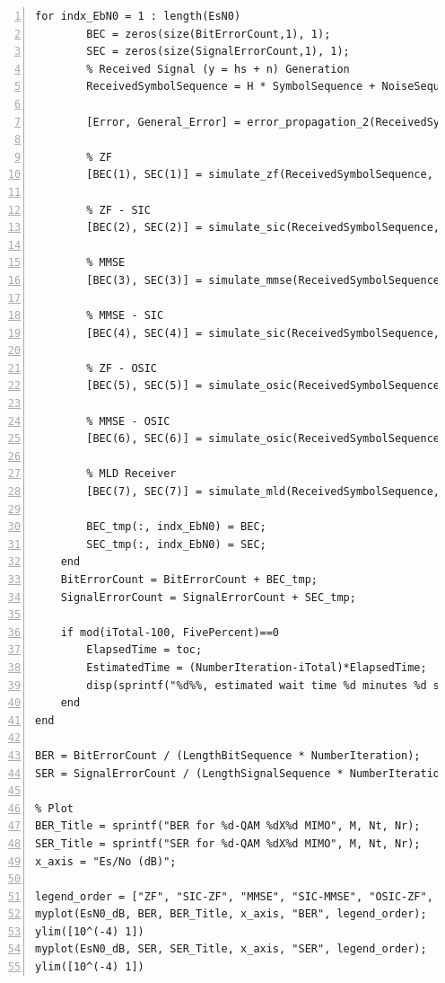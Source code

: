 \documentclass{article}
\begin{document}
\begin{lstlisting}[style=Matlab-editor, frame=single, numbers=left,]
    for indx_EbN0 = 1 : length(EsN0)
        BEC = zeros(size(BitErrorCount,1), 1);
        SEC = zeros(size(SignalErrorCount,1), 1);
        % Received Signal (y = hs + n) Generation
        ReceivedSymbolSequence = H * SymbolSequence + NoiseSequence * sqrt(1 / EsN0(indx_EbN0)); % log2(M)x1 matrix
        
        [Error, General_Error] = error_propagation_2(ReceivedSymbolSequence, SignalSequence, SignalBinary,  M, H, EsN0, ReceiverType)
        
        % ZF
        [BEC(1), SEC(1)] = simulate_zf(ReceivedSymbolSequence, SignalSequence, SignalBinary, M, H);
        
        % ZF - SIC
        [BEC(2), SEC(2)] = simulate_sic(ReceivedSymbolSequence, SignalSequence, SignalBinary,  M, H, EsN0(indx_EbN0), 'zf');
        
        % MMSE
        [BEC(3), SEC(3)] = simulate_mmse(ReceivedSymbolSequence, SignalSequence, SignalBinary, M, H, EsN0(indx_EbN0));
                
        % MMSE - SIC
        [BEC(4), SEC(4)] = simulate_sic(ReceivedSymbolSequence, SignalSequence, SignalBinary,  M, H, EsN0(indx_EbN0), 'mmse');
        
        % ZF - OSIC
        [BEC(5), SEC(5)] = simulate_osic(ReceivedSymbolSequence, SignalSequence, SignalBinary,  M, H, EsN0(indx_EbN0), 'zf');

        % MMSE - OSIC
        [BEC(6), SEC(6)] = simulate_osic(ReceivedSymbolSequence, SignalSequence, SignalBinary,  M, H, EsN0(indx_EbN0), 'mmse');
                
        % MLD Receiver
        [BEC(7), SEC(7)] = simulate_mld(ReceivedSymbolSequence, SignalSequence, SignalBinary,  M, H);
        
        BEC_tmp(:, indx_EbN0) = BEC;
        SEC_tmp(:, indx_EbN0) = SEC;
    end
    BitErrorCount = BitErrorCount + BEC_tmp;
    SignalErrorCount = SignalErrorCount + SEC_tmp;
    
    if mod(iTotal-100, FivePercent)==0
        ElapsedTime = toc;
        EstimatedTime = (NumberIteration-iTotal)*ElapsedTime;
        disp(sprintf("%d%%, estimated wait time %d minutes %d seconds", round(iTotal/NumberIteration*100), floor(EstimatedTime/60), floor(mod(EstimatedTime, 60))))
    end
end

BER = BitErrorCount / (LengthBitSequence * NumberIteration);
SER = SignalErrorCount / (LengthSignalSequence * NumberIteration);

% Plot
BER_Title = sprintf("BER for %d-QAM %dX%d MIMO", M, Nt, Nr);
SER_Title = sprintf("SER for %d-QAM %dX%d MIMO", M, Nt, Nr);
x_axis = "Es/No (dB)";

legend_order = ["ZF", "SIC-ZF", "MMSE", "SIC-MMSE", "OSIC-ZF", "OSIC-MMSE", "MLD"];
myplot(EsN0_dB, BER, BER_Title, x_axis, "BER", legend_order);
ylim([10^(-4) 1])
myplot(EsN0_dB, SER, SER_Title, x_axis, "SER", legend_order);
ylim([10^(-4) 1])
\end{lstlisting}
\end{document}
